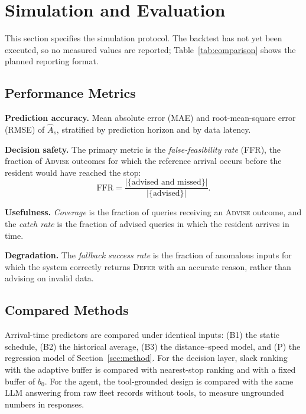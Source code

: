 \section{Simulation and Evaluation}\label{sec:experiments}

This section specifies the simulation protocol. The backtest has not yet been executed, so no measured values are reported; Table~\ref{tab:comparison} shows the planned reporting format.

\subsection{Performance Metrics}
\textbf{Prediction accuracy.} Mean absolute error (MAE) and root-mean-square error (RMSE) of $\hat{A}_s$, stratified by prediction horizon and by data latency.

\textbf{Decision safety.} The primary metric is the \emph{false-feasibility rate} (FFR), the fraction of \textsc{Advise} outcomes for which the reference arrival occurs before the resident would have reached the stop:
\begin{equation}
\mathrm{FFR} = \frac{\left|\{\text{advised and missed}\}\right|}{\left|\{\text{advised}\}\right|}.
\label{eq:ffr}
\end{equation}

\textbf{Usefulness.} \emph{Coverage} is the fraction of queries receiving an \textsc{Advise} outcome, and the \emph{catch rate} is the fraction of advised queries in which the resident arrives in time.

\textbf{Degradation.} The \emph{fallback success rate} is the fraction of anomalous inputs for which the system correctly returns \textsc{Defer} with an accurate reason, rather than advising on invalid data.

\subsection{Compared Methods}
Arrival-time predictors are compared under identical inputs: (B1) the static schedule, (B2) the historical average, (B3) the distance--speed model, and (P) the regression model of Section~\ref{sec:method}. For the decision layer, slack ranking with the adaptive buffer is compared with nearest-stop ranking and with a fixed buffer of $b_0$. For the agent, the tool-grounded design is compared with the same LLM answering from raw fleet records without tools, to measure ungrounded numbers in responses.

